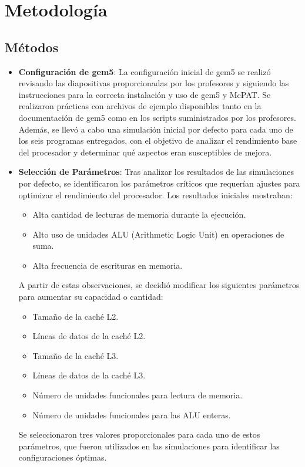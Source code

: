 \documentclass[conference]{IEEEtran}
\begin{document}
\section{Metodología}

\subsection{Métodos}
\begin{itemize}
    \item \textbf{Configuración de gem5}:  
    La configuración inicial de gem5 se realizó revisando las diapositivas proporcionadas por los profesores y siguiendo las instrucciones para la correcta instalación y uso de gem5 y McPAT. Se realizaron prácticas con archivos de ejemplo disponibles tanto en la documentación de gem5 como en los scripts suministrados por los profesores. Además, se llevó a cabo una simulación inicial por defecto para cada uno de los seis programas entregados, con el objetivo de analizar el rendimiento base del procesador y determinar qué aspectos eran susceptibles de mejora.

    \item \textbf{Selección de Parámetros}:  
    Tras analizar los resultados de las simulaciones por defecto, se identificaron los parámetros críticos que requerían ajustes para optimizar el rendimiento del procesador. Los resultados iniciales mostraban:
    \begin{itemize}
        \item Alta cantidad de lecturas de memoria durante la ejecución.
        \item Alto uso de unidades ALU (Arithmetic Logic Unit) en operaciones de suma.
        \item Alta frecuencia de escrituras en memoria.
    \end{itemize}
    A partir de estas observaciones, se decidió modificar los siguientes parámetros para aumentar su capacidad o cantidad:
    \begin{itemize}
        \item Tamaño de la caché L2.
        \item Líneas de datos de la caché L2.
        \item Tamaño de la caché L3.
        \item Líneas de datos de la caché L3.
        \item Número de unidades funcionales para lectura de memoria.
        \item Número de unidades funcionales para las ALU enteras.
    \end{itemize}
    Se seleccionaron tres valores proporcionales para cada uno de estos parámetros, que fueron utilizados en las simulaciones para identificar las configuraciones óptimas.


\end{itemize}
\end{document}

